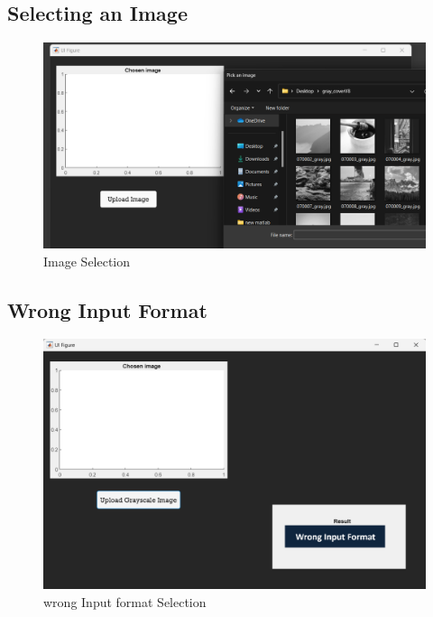 \subsection{Selecting an Image}
\begin{figure}[H]
    \centering
    \includegraphics[width=140mm]{./img/selectsample.png}
    \caption{Image Selection}
\end{figure}
\subsection{Wrong Input Format}
\begin{figure}[H]
    \centering
    \includegraphics[width=140mm]{./img/error.png}
    \caption{wrong Input format Selection}
\end{figure}

\clearpage
